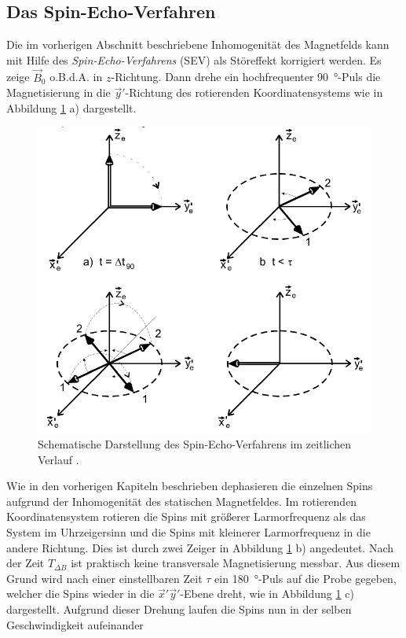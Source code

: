 \subsection{Das Spin-Echo-Verfahren}
\label{sec:Spin-Echo-Verfahren}

Die im vorherigen Abschnitt beschriebene Inhomogenität des Magnetfelds kann
mit Hilfe des \emph{Spin-Echo-Verfahrens} (SEV) als Störeffekt korrigiert werden.
Es zeige $\vec{B}_0$ o.B.d.A. in $z$-Richtung.
Dann drehe ein hochfrequenter \SI{90}{\degree}-Puls die Magnetisierung in
die $\vec{y}'$-Richtung des rotierenden Koordinatensystems
wie in Abbildung \ref{fig:Spin-Echo-Schema} a) dargestellt.
\begin{figure}
  \centering
  \includegraphics[width=.7\textwidth]{images/spin-echo-schema.pdf}
  \caption{Schematische Darstellung des Spin-Echo-Verfahrens im zeitlichen Verlauf \cite[9]{anleitung}.}
  \label{fig:Spin-Echo-Schema}
\end{figure}
Wie in den vorherigen Kapiteln beschrieben dephasieren die einzelnen Spins
aufgrund der Inhomogenität des statischen Magnetfeldes.
Im rotierenden Koordinatensystem rotieren die Spins mit größerer Larmorfrequenz als
das System im Uhrzeigersinn und die Spins mit kleinerer Larmorfrequenz
in die andere Richtung.
Dies ist durch zwei Zeiger in Abbildung \ref{fig:Spin-Echo-Schema} b) angedeutet.
Nach der Zeit $T_{\Delta B}$ ist praktisch keine transversale Magnetisierung messbar.
Aus diesem Grund wird nach einer einstellbaren Zeit $\tau$ ein
\SI{180}{\degree}-Puls auf die Probe gegeben, welcher die Spins wieder in die
$\vec{x}' \vec{y}'$-Ebene dreht, wie in Abbildung \ref{fig:Spin-Echo-Schema} c) dargestellt.
Aufgrund dieser Drehung laufen die Spins nun in der selben Geschwindigkeit aufeinander
